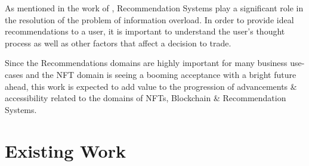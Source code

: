 \documentclass[a4paper, 12pt, oneside]{report}
\begin{document}
As mentioned in the work of \textcite{cheng_hybrid_2020}, Recommendation Systems play a significant role in the resolution of the problem of information overload. In order to provide ideal recommendations to a user, it is important to understand the user's thought process as well as other factors that affect a decision to trade.


Since the Recommendations domains are highly important for many business use-cases and the NFT domain is seeing a booming acceptance with a bright future ahead, this work is expected to add value to the progression of advancements \& accessibility related to the domains of NFTs, Blockchain \& Recommendation Systems.

\chapter{Existing Work}
\end{document}
